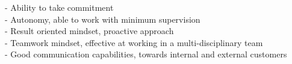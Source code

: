 
\begin{cventries}

- Ability to take commitment \\
- Autonomy, able to work with minimum supervision \\
- Result oriented mindset, proactive approach \\
- Teamwork mindset, effective at working in a multi-disciplinary team \\
- Good communication capabilities, towards internal and external customers \\

\end{cventries}
